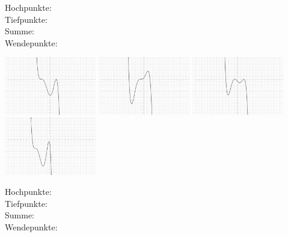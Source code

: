 \documentclass[12pt, parskip=half, a4paper, oneside]{scrartcl}
\begin{document}
\begin{addmargin}[-2cm]{0pt}
Hochpunkte: \\
Tiefpunkte: \\
Summe: \\
Wendepunkte:
\end{addmargin}

\includegraphics[width=4cm]{Bilder/G59}\hfill
\includegraphics[width=4cm]{Bilder/G510}\hfill
\includegraphics[width=4cm]{Bilder/G511}\hfill
\includegraphics[width=4cm]{Bilder/G512}

\begin{addmargin}[-2cm]{0pt}
Hochpunkte: \\
Tiefpunkte: \\
Summe: \\
Wendepunkte:
\end{addmargin}
\end{document}
